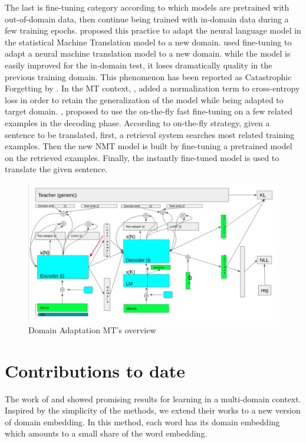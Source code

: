 \documentclass[12pt,a4paper,twoside]{report}
\theoremstyle{definition}
\begin{document}
The last is fine-tuning category according to which models are pretrained with out-of-domain data, then continue being trained with in-domain data during a few training epochs. \cite{Thomas11limsi}  proposed this practice to adapt the neural language model in the statistical Machine Translation model to a new domain. \cite{Luong15stanford} used fine-tuning to adapt a neural machine translation model to a new domain. while the model is easily improved for the in-domain test, it loses dramatically quality in the previous training domain. This phenomenon has been reported as Catastrophic Forgetting by \cite{Michael89catastrophic}. In the MT context, \cite{brian19overcoming}, \cite{khayrallah2018regularized} added
a normalization term to cross-entropy loss in order to retain the generalization of the model while being adapted to target domain. \cite{Farajian17multidomain}, \cite{li2018one} proposed to use the on-the-fly fast fine-tuning on a few related examples in the decoding phase. According to on-the-fly strategy, given a sentence to be translated, first, a retrieval system searches most related training examples. Then the new NMT model is built by fine-tuning a pretrained model on the retrieved examples. Finally, the instantly fine-tuned model is used to translate the given sentence.

\begin{figure}[h]
\includegraphics[scale=0.3]{DA_overview.png}
\caption{Domain Adaptation MT's overview}
\label{fig:overview}
\end{figure}

\section*{Contributions to date}
The work of \cite{Kobus17domain} and \cite{Daume07frustratingly} showed promising results for learning in a multi-domain context. Inspired by the simplicity of the methods, we extend their works to a new version of domain embedding. In this method, each word has its domain embedding which amounts to a small share of the word embedding. 
\end{document}
